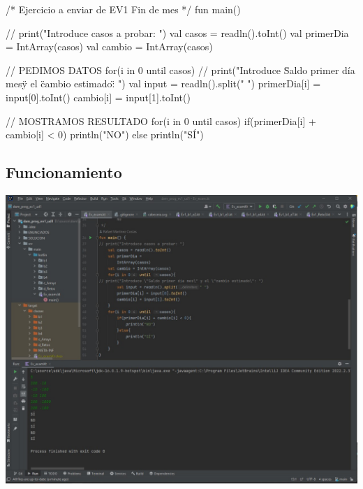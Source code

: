 \documentclass[a4paper,12pt]{article}
\begin{document}
\begin{verbnobox}[\fontsize{12pt}{12pt}\selectfont]
/* Ejercicio a enviar de EV1
    Fin de mes
 */
fun main() {
    // print("Introduce casos a probar: ")
    val casos = readln().toInt()
    val primerDia =  IntArray(casos)
    val cambio = IntArray(casos)

    // PEDIMOS DATOS
    for(i in 0 until casos){
        // print("Introduce \"Saldo primer día mes\" y el \"cambio estimado\": ")
        val input = readln().split(" ")
        primerDia[i] = input[0].toInt()
        cambio[i] = input[1].toInt()
    }

    // MOSTRAMOS RESULTADO
    for(i in 0 until casos){
        if(primerDia[i] + cambio[i] < 0){
            println("NO")
        }else{
            println("SÍ")
        }
    }
}
\end{verbnobox}
\clearpage
\subsection{Funcionamiento}
\includegraphics[width=17cm]{Captura}
\end{document}
